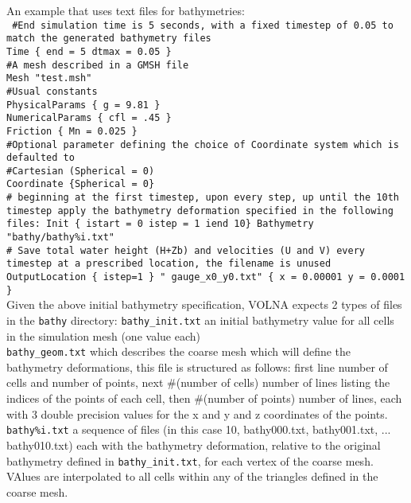 \documentclass[11pt]{article}
\begin{document}
An example that uses text files for bathymetries: \\
{\tt
\#End simulation time is 5 seconds, with a fixed timestep of 0.05 to match the generated bathymetry files \\
Time \{ end = 5 dtmax = 0.05 \} \\
\#A mesh described in a GMSH file \\
Mesh "test.msh" \\
\#Usual constants \\
PhysicalParams \{ g = 9.81 \} \\
NumericalParams \{ cfl = .45 \} \\
Friction \{ Mn = 0.025 \} \\
\#Optional parameter defining the choice of Coordinate system which is defaulted to \\
\#Cartesian (Spherical = 0) \\
Coordinate \{Spherical = 0\} \\
\# beginning at the first timestep, upon every step, up until the 10th timestep apply the bathymetry deformation specified in the following files:
Init \{ istart = 0 istep = 1 iend 10\} Bathymetry "bathy/bathy\%i.txt" \\
\# Save total water height (H+Zb) and velocities (U and V) every timestep at a prescribed location, the filename is unused \\
OutputLocation \{ istep=1 \} " gauge\_x0\_y0.txt" \{ x = 0.00001 y = 0.0001 \}
}
\\
Given the above initial bathymetry specification, VOLNA expects 2 types of files in the \texttt{bathy} directory:
\texttt{bathy\_init.txt} an initial bathymetry value for all cells in the simulation mesh (one value each) \\
\texttt{bathy\_geom.txt} which describes the coarse mesh which will define the bathymetry deformations, this file is structured as follows: first line number of cells and number of points, next \#(number of cells) number of lines listing the indices of the points of each cell, then \#(number of points) number of lines, each with 3 double precision values for the x and y and z coordinates of the points.\\
\texttt{bathy\%i.txt} a sequence of files (in this case 10, bathy000.txt, bathy001.txt, ... bathy010.txt) each with the bathymetry deformation, relative to the original bathymetry defined in \texttt{bathy\_init.txt}, for each vertex of the coarse mesh. VAlues are interpolated to all cells within any of the triangles defined in the coarse mesh.

\end{document}
